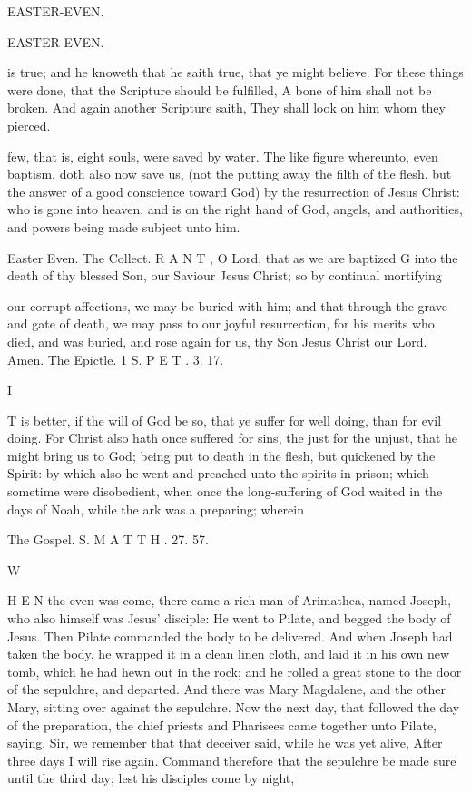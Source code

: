 EASTER-EVEN.

EASTER-EVEN.

is true; and he knoweth that he saith true, that ye might believe. For these things were done, that the Scripture should be fulfilled, A bone of him shall not be broken. And again another Scripture saith, They shall look on him whom they pierced.

few, that is, eight souls, were saved by water. The like figure whereunto, even baptism, doth also now save us, (not the putting away the filth of the flesh, but the answer of a good conscience toward God) by the resurrection of Jesus Christ: who is gone into heaven, and is on the right hand of God, angels, and authorities, and powers being made subject unto him.

Easter Even. The Collect. R A N T , O Lord, that as we are baptized G into the death of thy blessed Son, our Saviour Jesus Christ; so by continual mortifying

our corrupt affections, we may be buried with him; and that through the grave and gate of death, we may pass to our joyful resurrection, for his merits who died, and was buried, and rose again for us, thy Son Jesus Christ our Lord. Amen. The Epictle. 1 S. P E T . 3. 17.

I

T is better, if the will of God be so, that ye suffer for well doing, than for evil doing. For Christ also hath once suffered for sins, the just for the unjust, that he might bring us to God; being put to death in the flesh, but quickened by the Spirit: by which also he went and preached unto the spirits in prison; which sometime were disobedient, when once the long-suffering of God waited in the days of Noah, while the ark was a preparing; wherein

The Gospel. S. M A T T H . 27. 57.

W

H E N the even was come, there came a rich man of Arimathea, named Joseph, who also himself was Jesus' disciple: He went to Pilate, and begged the body of Jesus. Then Pilate commanded the body to be delivered. And when Joseph had taken the body, he wrapped it in a clean linen cloth, and laid it in his own new tomb, which he had hewn out in the rock; and he rolled a great stone to the door of the sepulchre, and departed. And there was Mary Magdalene, and the other Mary, sitting over against the sepulchre. Now the next day, that followed the day of the preparation, the chief priests and Pharisees came together unto Pilate, saying, Sir, we remember that that deceiver said, while he was yet alive, After three days I will rise again. Command therefore that the sepulchre be made sure until the third day; lest his disciples come by night,

